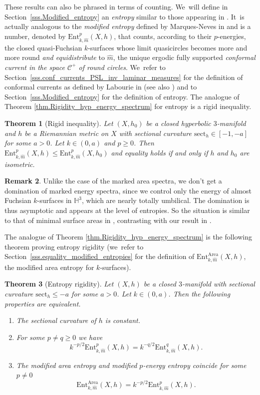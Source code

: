 \documentclass[10pt]{amsart}
\newcommand{\ksurfaces}{$k$\nobreakdash-surfaces\xspace}
\theoremstyle{plain}
\newtheorem{theorem}{Theorem}[section]
\theoremstyle{definition}
\newtheorem{remark}[theorem]{Remark}
\newcommand\Hyp{\mathbb{H}^3}
\newcommand{\cC}{{\mathcal C}}
\newcommand{\sect}{\mathrm{sect}}
\newcommand{\Ent}{\mathrm{Ent}}
\begin{document}
These results can also be phrased in terms of counting. We~will define in Section~\ref{sss.Modified_entropy} an \emph{entropy} similar to those appearing in \cite{ALS,CMN}. It~is actually analogous to the \emph{modified entropy} defined by Marques-Neves in \cite{MN_currents} and is a number, denoted by $\Ent^p_{k,\hat m}(X,h)$, that counts, according to their $p$-energies, the closed quasi-Fuchsian \ksurfaces whose limit quasicircles becomes more and more round \emph{and equidistribute} to $\hat m$, the unique ergodic fully supported \emph{conformal current in the space $\cC^+$ of round circles}. We~refer to Section~\ref{sss.conf_currents_PSL_inv_laminar_measures} for the definition of conformal currents as defined by Labourie in \cite{LabourieBourbaki} (see also \cite{ALS,MN_currents}) and to Section~\ref{sss.Modified_entropy} for the definition of entropy. The analogue of Theorem \ref{thm.Rigidity_hyp_energy_spectrum} for entropy is a rigid inequality.


\begin{theorem}[Rigid inequality]\label{th.rigidity_entropy}
Let $(X,h_0)$ be a closed hyperbolic $3$\nobreakdash-manifold and $h$ be a Riemannian metric on $X$ with sectional curvature $\sect_h\in[-1,-a]$ for some $a>0$. Let $k\in (0,a)$ and $p\geq 0$. Then $\Ent^p_{k,\hat m}(X,h)\leq\Ent^p_{k,\hat m}(X,h_0)$ and equality holds if and only if $h$ and $h_0$ are isometric.
\end{theorem}


\begin{remark}
Unlike the case of the marked area spectra, we don't get a domination of marked energy spectra, since we control only the energy of almost Fuchsian $k$\nobreakdash-surfaces in $\Hyp$, which are nearly totally umbilical. The domination is thus asymptotic and appears at the level of entropies. So the situation is similar to that of minimal surface areas in \cite{CMN}, contrasting with our result in \cite{ALS}.
\end{remark}

The analogue of Theorem \ref{thm.Rigidity_hyp_energy_spectrum} is the following theorem proving entropy rigidity (we~refer to Section~\ref{sss.equality_modified_entropies} for the definition of $\Ent^\mathrm{Area}_{k,\hat m}(X,h)$, the modified area entropy for \ksurfaces).


\begin{theorem}[Entropy rigidity]\label{equality_energy_area}
Let $(X,h)$ be a closed $3$\nobreakdash-manifold with sectional curvature $\sect_h\leq -a$ for some $a>0$. Let $k\in (0,a)$. Then the following properties are equivalent.
\begin{enumerate}
\item The sectional curvature of $h$ is constant.
\item For some $p\neq q\geq 0$ we have
\[
k^{-p/2} \Ent^p_{k,\hat m}(X,h)=k^{-q/2}\Ent^q_{k,\hat m}(X,h).
\]

\item The modified area entropy and modified $p$-energy entropy coincide for some $p\neq 0$
\[
\Ent^\mathrm{Area}_{k,\hat m}(X,h)=k^{-p/2}\Ent^p_{k,\hat m}(X,h).
\]
\end{enumerate}
\end{theorem}
\end{document}

